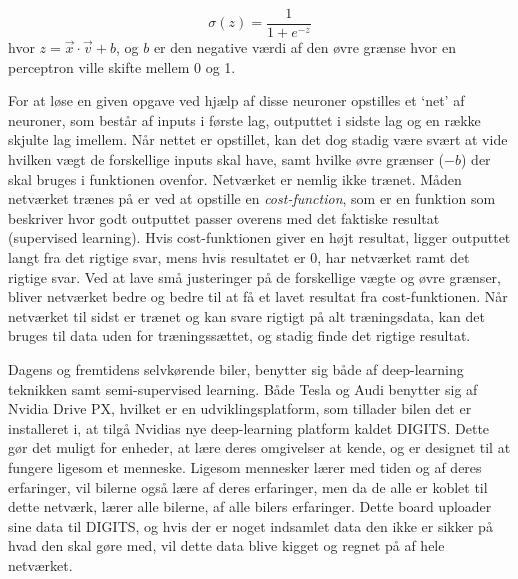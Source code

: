 \begin{equation}
	\sigma(z)=\frac{1}{1+e^{-z}}
\end{equation}
hvor $z=\vec{x}\cdot \vec{v} + b$, og $b$ er den negative værdi af den øvre grænse hvor en perceptron ville skifte mellem 0 og 1.

For at løse en given opgave ved hjælp af disse neuroner opstilles et `net' af neuroner, som består af inputs i første lag, outputtet i sidste lag og en række skjulte lag imellem. Når nettet er opstillet, kan det dog stadig være svært at vide hvilken vægt de forskellige inputs skal have, samt hvilke øvre grænser ($-b$) der skal bruges i funktionen ovenfor. Netværket er nemlig ikke trænet. Måden netværket trænes på er ved at opstille en \textit{cost-function}, som er en funktion som beskriver hvor godt outputtet passer overens med det faktiske resultat (supervised learning). Hvis cost-funktionen giver en højt resultat, ligger outputtet langt fra det rigtige svar, mens hvis resultatet er 0, har netværket ramt det rigtige svar. Ved at lave små justeringer på de forskellige vægte og øvre grænser, bliver netværket bedre og bedre til at få et lavet resultat fra cost-funktionen. Når netværket til sidst er trænet og kan svare rigtigt på alt træningsdata, kan det bruges til data uden for træningssættet, og stadig finde det rigtige resultat. 

Dagens og fremtidens selvkørende biler, benytter sig både af deep-learning teknikken samt semi-supervised learning\cite{Musk}. Både Tesla og Audi benytter sig af Nvidia Drive PX, hvilket er en udviklingsplatform, som tillader bilen det er installeret i, at tilgå Nvidias nye deep-learning platform kaldet DIGITS. Dette gør det muligt for enheder, at lære deres omgivelser at kende, og er designet til at fungere ligesom et menneske. Ligesom mennesker lærer med tiden og af deres erfaringer, vil bilerne også lære af deres erfaringer, men da de alle er koblet til dette netværk, lærer alle bilerne, af alle bilers erfaringer\cite{Nvidia}. Dette board uploader sine data til DIGITS, og hvis der er noget indsamlet data den ikke er sikker på hvad den skal gøre med, vil dette data blive kigget og regnet på af hele netværket.